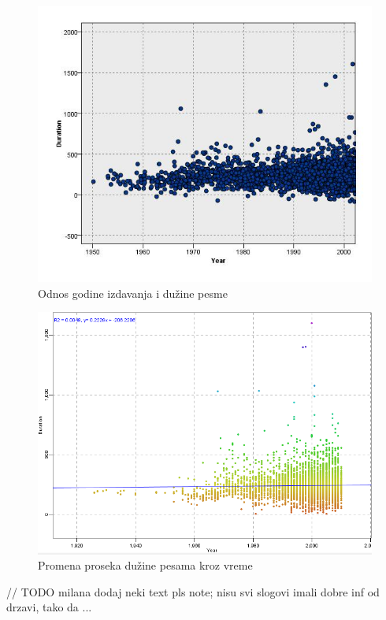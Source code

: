 \begin{figure}[H]
    \centering
    \includegraphics[scale=0.6]{resources/year-duration.jpg}
    \caption{Odnos godine izdavanja i du\v{z}ine pesme}
    \label{fig:YearDuration}
\end{figure}

\begin{figure}[H]
    \centering
    \includegraphics[scale=0.6]{resources/year-duration.PNG}
    \caption{Promena proseka du\v{z}ine pesama kroz vreme}
    \label{fig:YearDurationAvg}
\end{figure}


// TODO milana dodaj neki text pls
note; nisu svi slogovi imali dobre inf od drzavi, tako da ...

